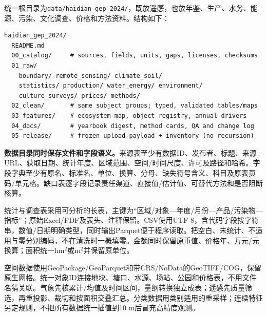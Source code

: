 \documentclass[12pt,a4paper,fontset=fandol]{ctexart}
\newcommand{\file}[1]{\nolinkurl{#1}}
\begin{document}
统一根目录为\file{data/haidian_gep_2024/}，既放遥感，也放年鉴、生产、水务、能源、污染、文化调查、价格和方法资料。结构如下：
\begin{lstlisting}
haidian_gep_2024/
  README.md
  00_catalog/     # sources, fields, units, gaps, licenses, checksums
  01_raw/
    boundary/ remote_sensing/ climate_soil/
    statistics/ production/ water_energy/ environment/
    culture_surveys/ prices/ methods/
  02_clean/       # same subject groups; typed, validated tables/maps
  03_features/    # ecosystem map, object registry, annual drivers
  04_docs/        # yearbook digest, method cards, QA and change log
  05_release/     # frozen upload payload + inventory (no recursion)
\end{lstlisting}
\textbf{数据目录同时保存文件和字段语义。}来源表至少有数据ID、发布者、标题、来源URL、获取日期、统计年度、区域范围、空间/时间尺度、许可及路径和哈希。字段字典至少有原名、标准名、单位、换算、分母、缺失符号含义、科目及原表页码/单元格。缺口表逐字段记录责任渠道、直接值/估计值、可替代方法和是否阻断核算。

统计与调查表采用可分析的长表，主键为“区域/对象—年度/月份—产品/污染物—指标”；原始Excel/PDF及表头、注释保留。CSV使用UTF-8，含代码字段按字符串，数值/日期明确类型，同时输出Parquet便于程序读取。把空白、未统计、不适用与零分别编码，不在清洗时一概填零。金额同时保留原币值、价格年、万元/元换算；面积统一hm$^2$或m$^2$并保留原单位。

空间数据使用GeoPackage/GeoParquet和带CRS/NoData的GeoTIFF/COG，保留原生网格。统一对象ID连接地块、塘口、水源、场站、公园和价格表，不用文件名猜关联。气象先核累计/均值及时间区间，量纲转换独立成表；遥感先质量筛选，再重投影、裁切和按面积交叠汇总。分类数据用类别适用的重采样；连续特征另定规则，不把所有数据统一插值到10 m后冒充高精度观测。
\end{document}
